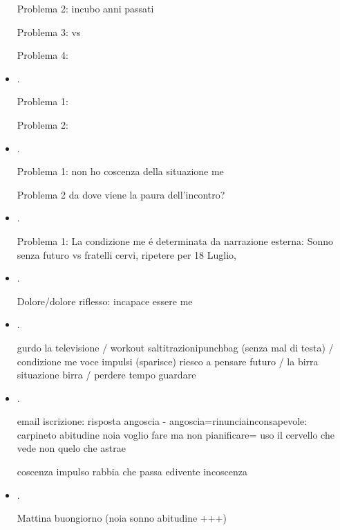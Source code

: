 \begin{itemize}
Problema 2:  incubo anni passati

Problema 3:  vs 

Problema 4:  


\item {}.

Problema 1: 

Problema 2: 

\item {}.

Problema 1: non ho coscenza della situazione me

Problema 2 da dove viene la paura dell'incontro?


\item {}.

Problema 1: La condizione me \'e determinata da narrazione esterna: Sonno senza futuro vs fratelli cervi, ripetere per 18 Luglio, 

\item {}.

Dolore/dolore riflesso: incapace essere me

\item {}.

gurdo la televisione / workout saltitrazionipunchbag (senza mal di testa) / condizione me voce impulsi (sparisce) riesco a pensare futuro / la birra situazione birra / perdere tempo guardare

\item {}.

email iscrizione: risposta angoscia - angoscia=rinunciainconsapevole: carpineto abitudine noia voglio fare ma non pianificare= uso il cervello che vede non quelo che  astrae

coscenza impulso rabbia che passa edivente incoscenza

\item {}.

Mattina buongiorno (noia sonno abitudine +++)


\end{itemize}
